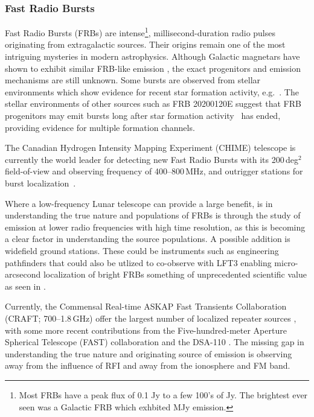 \subsubsection{Fast Radio Bursts}
Fast Radio Bursts (FRBs) are intense\footnote{Most FRBs have a peak flux of 0.1 Jy to a few 100's of Jy. The brightest ever seen was a Galactic FRB which exhbited MJy emission.}, millisecond-duration radio pulses originating from extragalactic sources. Their origins remain one of the most intriguing mysteries in modern astrophysics. Although Galactic magnetars have shown to exhibit similar FRB-like emission \citep{BC_2020,chime2020sgr1935}, the exact progenitors and emission mechanisms are still unknown. Some bursts are observed from stellar environments which show evidence for recent star formation activity, e.g.~\citet{piro2021}. The stellar environments of other sources such as FRB 20200120E suggest that FRB progenitors may emit bursts long after star formation activity~\citep{kirsten2022m81} has ended, providing evidence for multiple formation channels.

The Canadian Hydrogen Intensity Mapping Experiment (CHIME) telescope is currently the world leader for detecting new Fast Radio Bursts with its 200\,deg$^{2}$ field-of-view and observing frequency of 400--800\,MHz, and outrigger stations for burst localization~\citep{leung2021synoptic,lanman2024kko}. 

Where a low-frequency Lunar telescope can provide a large benefit, is in understanding the true nature and populations of FRBs is through the study of emission at lower radio frequencies with high time resolution, as this is becoming a clear factor in understanding the source populations. A possible addition is widefield ground stations. These could be instruments such as engineering pathfinders that could also be utlized to co-observe with LFT3 enabling micro-arcsecond localization of bright FRBs something of unprecedented scientific value as seen in \cite{nimmo_burst_2023}. 

Currently, the Commensal Real-time ASKAP Fast Transients Collaboration (CRAFT; 700--1.8\,GHz) offer the largest number of localized repeater sources \citep{shannon2024ics, SD_2023}, with some more recent contributions from the Five-hundred-meter Aperture Spherical Telescope (FAST) collaboration \citep[1.00--1.45\,GHz;][]{ZX_2023} and the DSA-110 \citep{LC_2023,sharma2024preferential}. The missing gap in understanding the true nature and originating source of emission is observing away from the influence of RFI and away from the ionosphere and FM band.

